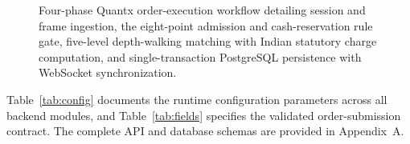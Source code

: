 \documentclass[12pt]{article}
\begin{document}
\begin{figure}[!htbp]
{}
\caption{Four-phase Quantx order-execution workflow detailing session and frame ingestion, the eight-point admission and cash-reservation rule gate, five-level depth-walking matching with Indian statutory charge computation, and single-transaction PostgreSQL persistence with WebSocket synchronization.}
\label{fig:phases}
\end{figure}

Table~\ref{tab:config} documents the runtime configuration parameters across all backend modules, and Table~\ref{tab:fields} specifies the validated order-submission contract. The complete API and database schemas are provided in Appendix~A.
\end{document}
